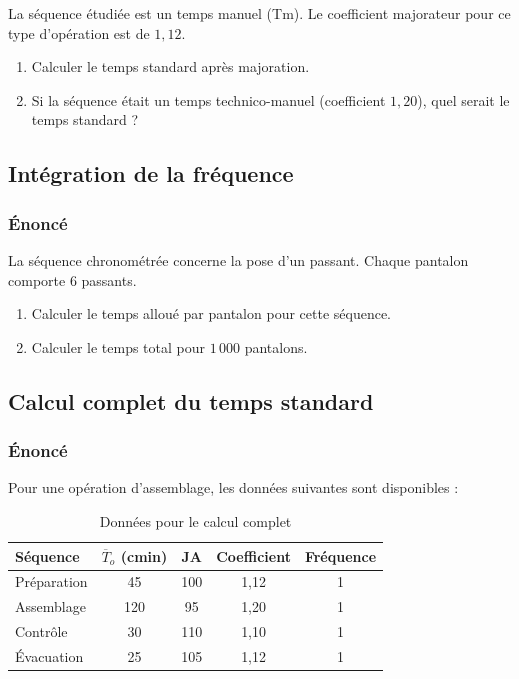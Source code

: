 \documentclass[a4paper,12pt]{article}
\begin{document}
La séquence étudiée est un temps manuel (Tm). Le coefficient majorateur pour ce type d'opération est de $1,12$.

\begin{enumerate}
    \item Calculer le temps standard après majoration.
    \item Si la séquence était un temps technico-manuel (coefficient $1,20$), quel serait le temps standard ?
\end{enumerate}

\subsection{Intégration de la fréquence}

\subsubsection*{Énoncé}

La séquence chronométrée concerne la pose d'un passant. Chaque pantalon comporte $6$ passants.

\begin{enumerate}
    \item Calculer le temps alloué par pantalon pour cette séquence.
    \item Calculer le temps total pour $1\,000$ pantalons.
\end{enumerate}

\subsection{Calcul complet du temps standard}

\subsubsection*{Énoncé}

Pour une opération d'assemblage, les données suivantes sont disponibles :

\begin{table}[ht]
\centering
\begin{tabular}{|l|c|c|c|c|}
\hline
\textbf{Séquence} & $\overline{T}_o$ (cmin) & \textbf{JA} & \textbf{Coefficient} & \textbf{Fréquence} \\
\hline
Préparation & 45 & 100 & 1,12 & 1 \\
Assemblage & 120 & 95 & 1,20 & 1 \\
Contrôle & 30 & 110 & 1,10 & 1 \\
Évacuation & 25 & 105 & 1,12 & 1 \\
\hline
\end{tabular}
\caption{Données pour le calcul complet}
\end{table}
\end{document}
